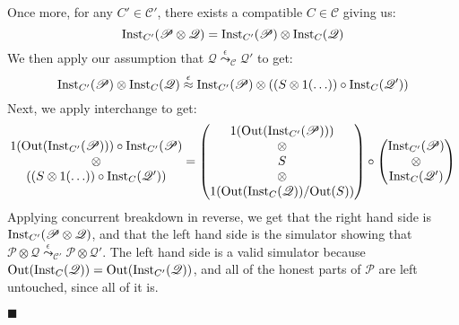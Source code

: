 \begin{theorem}
 Once more, for any $C' \in \mathscr{C}'$, there exists a compatible
$C \in \mathscr{C}$ giving us:
$$
\text{Inst}_{C'}(\mathscr{P} \otimes \mathscr{Q}) =
\text{Inst}_{C'}(\mathscr{P}) \otimes \text{Inst}_C(\mathscr{Q})
$$
We then apply our assumption that $\mathscr{Q} \overset{\epsilon}{\leadsto}_{\mathscr{C}} \mathscr{Q}'$
to get:
$$
\text{Inst}_{C'}(\mathscr{P}) \otimes \text{Inst}_C(\mathscr{Q})
\overset{\epsilon}{\approx}
\text{Inst}_{C'}(\mathscr{P}) \otimes ((S \otimes 1(\ldots)) \circ \text{Inst}_C(\mathscr{Q}'))
$$
Next, we apply interchange to get:
$$
\begin{matrix}
1(\text{Out}(\text{Inst}_{C'}(\mathscr{P}))) \circ \text{Inst}_{C'}(\mathscr{P})\cr
\otimes\cr
((S \otimes 1(\ldots)) \circ \text{Inst}_C(\mathscr{Q}'))
\end{matrix}
=
\begin{pmatrix}
1(\text{Out}(\text{Inst}_{C'}(\mathscr{P})))\cr
\otimes\cr
S\cr
\otimes\cr
1(\text{Out}(\text{Inst}_C(\mathscr{Q})) / \text{Out}(S))
\end{pmatrix}
\circ
\begin{pmatrix}
  \text{Inst}_{C'}(\mathscr{P})\cr
  \otimes\cr
  \text{Inst}_{C}(\mathscr{Q}')
\end{pmatrix}
$$
Applying concurrent breakdown in reverse, we get that the right hand
side is $\text{Inst}_{C'}(\mathscr{P} \otimes \mathscr{Q})$,
and that the left hand side is the simulator showing
that $\mathscr{P} \otimes \mathscr{Q} \overset{\epsilon}{\leadsto}_{\mathscr{C}'} \mathscr{P} \otimes \mathscr{Q}'$.
The left hand side is a valid simulator because
$\text{Out}(\text{Inst}_C(\mathscr{Q})) = \text{Out}(\text{Inst}_{C'}(\mathscr{Q}))$,
and all of the honest parts of $\mathscr{P}$ are left untouched,
since all of it is.

$\blacksquare$
\end{theorem}

